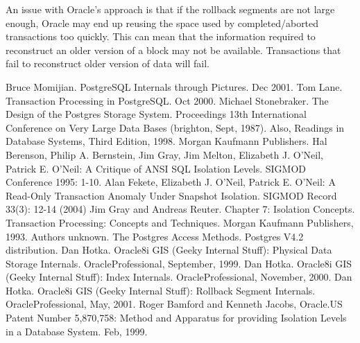 \documentclass{article}
\begin{document}
An issue with Oracle's approach is that if the rollback segments are
not large enough, Oracle may end up reusing the space used by
completed/aborted transactions too quickly. This can mean that the
information required to reconstruct an older version of a block may
not be available. Transactions that fail to reconstruct older
version of data will fail.

\begin{thebibliography}{breitestes Label}
	 Bruce Momijian. PostgreSQL Internals through Pictures. Dec 2001.
	 Tom Lane. Transaction Processing in PostgreSQL. Oct 2000.
	 Michael Stonebraker. The Design of the Postgres Storage System. Proceedings 13th International Conference on Very Large Data Bases (brighton, Sept, 1987). Also, Readings in Database Systems, Third Edition, 1998. Morgan Kaufmann Publishers.
	 Hal Berenson, Philip A. Bernstein, Jim Gray, Jim Melton, Elizabeth J. O'Neil, Patrick E. O'Neil: A Critique of ANSI SQL
	Isolation Levels. SIGMOD Conference 1995: 1-10.
	 Alan Fekete, Elizabeth J. O'Neil, Patrick E. O'Neil: A Read-Only Transaction Anomaly Under Snapshot Isolation. SIGMOD Record 33(3): 12-14 (2004)
	 Jim Gray and Andreas Reuter. Chapter 7: Isolation Concepts. Transaction Processing: Concepts and Techniques. Morgan Kaufmann Publishers, 1993.
	 Authors unknown. The Postgres Access Methods. Postgres V4.2 distribution.
	 Dan Hotka. Oracle8i GIS (Geeky Internal Stuff): Physical Data Storage Internals. OracleProfessional, September, 1999.
	 Dan Hotka. Oracle8i GIS (Geeky Internal Stuff): Index Internals. OracleProfessional, November, 2000.
	 Dan Hotka. Oracle8i GIS (Geeky Internal Stuff): Rollback Segment Internals. OracleProfessional, May, 2001.
	 Roger Bamford and Kenneth Jacobs, Oracle.US Patent Number 5,870,758: Method and Apparatus for providing Isolation Levels in a Database System. Feb, 1999.
\end{thebibliography}
\end{document}
